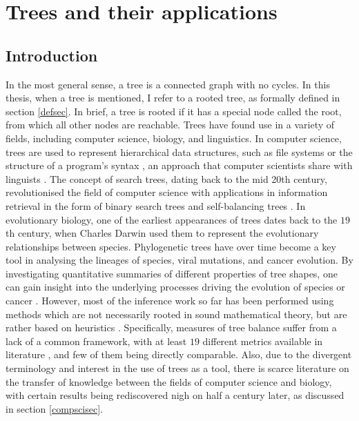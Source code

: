\section{Trees and their applications}

\subsection{Introduction}
In the most general sense, a tree is a connected graph with no cycles. In this
thesis, when a tree is mentioned, I refer to a rooted tree, as formally defined
in section \ref{defsec}. In brief, a tree is rooted if it has a special node
called the root, from which all other nodes are reachable.
Trees have found use in a variety of fields, including
computer science, biology, and linguistics. In computer science, trees are used
to represent hierarchical data structures, such as file systems
\cite{nievergelt_binary_1974} or the structure of a program's syntax
\cite{knuth_semantics_1968}, an approach that computer scientists share with
linguists \cite{chomsky_syntactic_1957}. The concept of search trees, dating
back to the mid 20th century, revolutionised the field of computer science with
applications in information retrieval in the form of binary search trees and
self-balancing trees \cite{nievergelt_binary_1972, knuth_art_1997}. In
evolutionary biology, one of the earliest appearances of trees dates back to
the $19$th century, when Charles Darwin used them to represent the evolutionary
relationships between species. Phylogenetic trees have over time become a key
tool in analysing the lineages of species, viral mutations, and cancer
evolution. By investigating quantitative summaries of different properties of
tree shapes, one can gain insight into the underlying processes driving the
evolution of species \cite{mooers_inferring_1997} or cancer
\cite{scott_inferring_2018, noble_spatial_2022}. However, most of the inference
work so far has been performed using methods which are not necessarily rooted
in sound mathematical theory, but are rather based on heuristics
\cite{omeara_evolutionary_2012}. Specifically, measures of tree balance suffer
from a lack of a common framework, with at least $19$ different metrics
available in literature \cite{fischer_tree_2021}, and few of them being
directly comparable. Also, due to the divergent terminology and interest in the
use of trees as a tool, there is scarce literature on the transfer of knowledge
between the fields of computer science and biology, with certain results being
rediscovered nigh on half a century later, as discussed in section
\ref{compscisec}.

